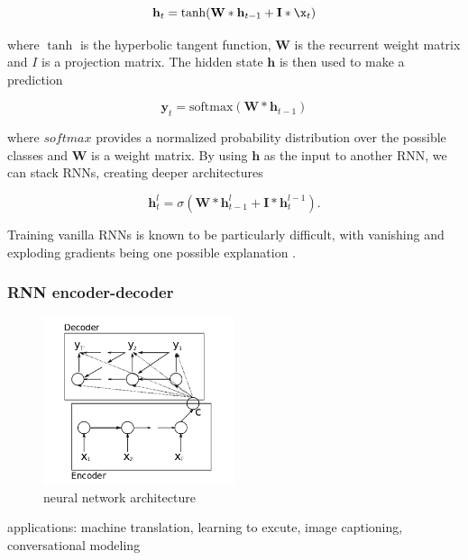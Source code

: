 \documentclass[review]{elsarticle}
\begin{document}
\begin{equation}
	\mathbf h_t = \tanh(\mathbf W * \mathbf h_{t-1} + \mathbf I * \x_t)
\end{equation}

where $\tanh$ is the hyperbolic tangent function, $\mathbf W$ is the recurrent weight matrix and $I$ is a projection matrix. The hidden state $\mathbf h$ is then used to make a prediction

\begin{equation}
	\mathbf y_t = \text{softmax}(\mathbf W * \mathbf h_{t-1})
\end{equation}

where $\textit{softmax}$ provides a normalized probability distribution over the possible classes and $\mathbf W$ is a weight matrix. By using $\mathbf h$ as the input to another RNN, we can stack RNNs, creating deeper architectures \citep{pascanu2013construct}

\begin{equation}
	\mathbf h_t^{l} = \sigma(\mathbf W * \mathbf h_{t-1}^{l} + \mathbf I * \mathbf h_t^{l-1}).
\end{equation}

Training vanilla RNNs is known to be particularly difficult, with vanishing and exploding gradients being one possible explanation \cite{pascanu2012difficulty}.

\subsubsection{RNN encoder-decoder}
\cite{ChoLearningTranslation}
\begin{figure}[h]
    \centering
    \includegraphics[width=0.5\textwidth]{RNN_encoder-decoder.png}
    \caption{neural network architecture}
    \label{fig:RNN_encoder-decoder}
\end{figure}
applications: machine translation, learning to excute, image captioning, conversational modeling
\end{document}
